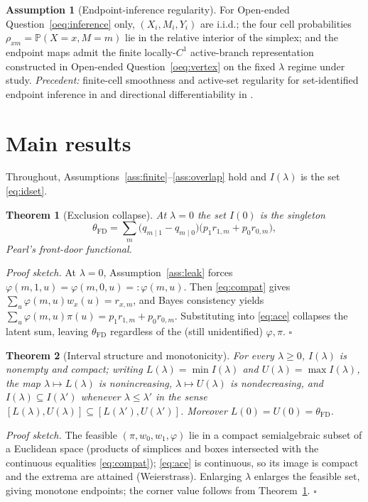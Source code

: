 \documentclass[11pt]{article}
\renewcommand{\Pr}{\mathbb{P}}
\theoremstyle{definition}
\newtheorem{assumption}{Assumption}
\theoremstyle{plain}
\newtheorem{theorem}{Theorem}
\theoremstyle{remark}
\begin{document}
\begin{assumption}[Endpoint-inference regularity]\label{ass:inference-regularity}
For Open-ended Question~\ref{oeq:inference} only, $(X_i,M_i,Y_i)$ are i.i.d.; the four cell probabilities
$\rho_{xm}=\Pr(X=x,M=m)$ lie in the relative interior of the simplex; and the endpoint maps admit the
finite locally-$C^1$ active-branch representation constructed in Open-ended Question~\ref{oeq:vertex} on
the fixed $\lambda$ regime under study. \emph{Precedent:} finite-cell smoothness and active-set regularity
for set-identified endpoint inference in \citet{ChernozhukovHongTamer2007ParameterSets} and directional
differentiability in \citet{FangSantos2019DirectionallyDifferentiable}.
\end{assumption}
\section{Main results}
\label{sec:results}
Throughout, Assumptions~\ref{ass:finite}--\ref{ass:overlap} hold and $I(\lambda)$ is the set
\eqref{eq:idset}.

\begin{theorem}[Exclusion collapse]\label{thm:collapse}
At $\lambda=0$ the set $I(0)$ is the singleton
\[
  \theta_{\mathrm{FD}}=\sum_{m}\bigl(q_{m\mid1}-q_{m\mid0}\bigr)\bigl(p_1 r_{1,m}+p_0 r_{0,m}\bigr),
\]
Pearl's front-door functional.
\end{theorem}
\noindent\emph{Proof sketch.} At $\lambda=0$, Assumption~\ref{ass:leak} forces $\varphi(m,1,u)=\varphi(m,0,u)=:\varphi(m,u)$.
Then \eqref{eq:compat} gives $\sum_u\varphi(m,u)w_x(u)=r_{x,m}$, and Bayes consistency yields
$\sum_u\varphi(m,u)\pi(u)=p_1 r_{1,m}+p_0 r_{0,m}$. Substituting into \eqref{eq:ace} collapses the latent
sum, leaving $\theta_{\mathrm{FD}}$ regardless of the (still unidentified) $\varphi,\pi$. \hfill$\square$

\begin{theorem}[Interval structure and monotonicity]\label{thm:interval}
For every $\lambda\ge0$, $I(\lambda)$ is nonempty and compact; writing $L(\lambda)=\min I(\lambda)$ and
$U(\lambda)=\max I(\lambda)$, the map $\lambda\mapsto L(\lambda)$ is nonincreasing, $\lambda\mapsto U(\lambda)$
is nondecreasing, and $I(\lambda)\subseteq I(\lambda')$ whenever $\lambda\le\lambda'$ in the sense
$[L(\lambda),U(\lambda)]\subseteq[L(\lambda'),U(\lambda')]$. Moreover $L(0)=U(0)=\theta_{\mathrm{FD}}$.
\end{theorem}
\noindent\emph{Proof sketch.} The feasible $(\pi,w_0,w_1,\varphi)$ lie in a compact semialgebraic subset of a
Euclidean space (products of simplices and boxes intersected with the continuous equalities
\eqref{eq:compat}); \eqref{eq:ace} is continuous, so its image is compact and the extrema are attained
(Weierstrass). Enlarging $\lambda$ enlarges the feasible set, giving monotone endpoints; the corner value
follows from Theorem~\ref{thm:collapse}. \hfill$\square$
\end{document}
